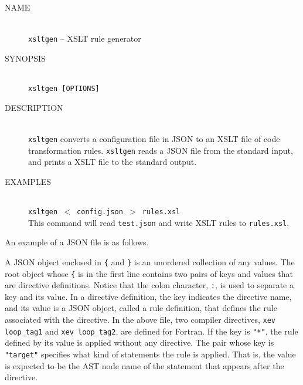 \begin{framed}
\begin{description}
 \item[NAME]~\\
	    \texttt{xsltgen} -- XSLT rule generator

 \item[SYNOPSIS]~\\
	    \texttt{xsltgen [OPTIONS] }

 \item[DESCRIPTION]~\\ \texttt{xsltgen} converts a configuration file in
	    JSON to an XSLT file of code transformation rules.
	    \texttt{xsltgen} reads a JSON file from the standard input,
	    and prints a XSLT file to the standard
	    output.

 \item[EXAMPLES]~\\ \texttt{xsltgen $<$ config.json $>$ rules.xsl}\\ This command
	    will read \texttt{test.json} and write XSLT rules to \texttt{rules.xsl}.
\end{description}
\end{framed}

An example of a JSON file is as follows.
\begin{framed}
\end{framed}

A JSON object enclosed in \texttt{\{} and \texttt{\}} is an unordered
collection of any values. The root object whose \texttt{\{} is in the
first line contains two pairs of keys and values that are directive
definitions.  Notice that the colon character, \texttt{:}, is used to
separate a key and its value. In a directive definition, the key
indicates the directive name, and its value is a JSON object, called a
rule definition, that defines the rule associated with the directive.
In the above file, two compiler directives, \texttt{xev loop\_tag1} and
\texttt{xev loop\_tag2}, are defined for Fortran. If the key is
\texttt{"*"}, the rule defined by its value is applied without any
directive. The pair whose key is \texttt{"target"} specifies what kind
of statements the rule is applied. That is, the value is expected to be
the AST node name of the statement that appears after the directive.

